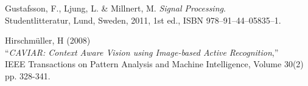 \begin{thebibliography}{9}
	Gustafsson, F., Ljung, L. \& Millnert, M.
	\emph{Signal Processing}.\\
	Studentlitteratur, Lund, Sweden,
	2011, 1st ed.,
	ISBN 978--91--44--05835--1.



	Hirschmüller, H (2008)\\
	``\textit{CAVIAR: Context Aware Vision using Image-based Active Recognition},''\\
	IEEE Transactions on Pattern Analysis and Machine Intelligence, Volume 30(2)
	pp. 328-341.
	


\end{thebibliography}